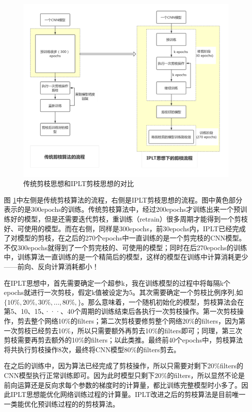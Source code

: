 \documentclass[ pdftex, oneside, master]{NJUthesis}
\begin{document}
\begin{figure}
\centering
\includegraphics[width=\textwidth]{pruning_contrast.pdf}
\caption{传统剪枝思想和IPLT剪枝思想的对比}
\label{pruning_contrast2}
\end{figure}

图 \ref{pruning_contrast2}中左侧是传统剪枝算法的流程，右侧是IPLT剪枝思想的流程。图中黄色部分表示的是300epochs的训练。传统剪枝算法中，经过200epochs才训练出来一个预训练好的模型，但是还需要迭代剪枝，重训练（retrain）很多周期才能得到一个剪枝好、可使用的模型。而在右侧，同样是300epochs，前30epochs内，IPLT已经完成了对模型的剪枝，在之后的270个epochs中一直训练的是一个剪完枝的CNN模型。不仅300epochs就得到了一个剪完枝的、可使用的模型；同时在后270epochs的训练中，训练算法一直训练的是一个精简后的模型，这样的模型在训练中计算消耗更少——前向、反向计算消耗都小！

在IPLT思想中，首先需要确定一个超参k，我在训练模型的过程中将每隔k个epochs就进行一次剪枝，假定k值被设定为5。其次需要确定一个剪枝比例序列,如$\{10\%, 20\%, 30\%, \dots, 80\%,\}$。那么意味着，一个随机初始化的模型，剪枝算法会在第5、10、15、···、40个周期的训练结束后各执行一次剪枝操作。第一次剪枝操作，剪去整个网络10\%的filters；第二次剪枝要修剪整个网络20\%的filters，因为第一次剪枝已经剪去10\%，所以只需要额外再剪去10\%的filters即可；同理，第三次剪枝需要再剪去额外的10\%的filters；以此类推。最终前40个epochs中，剪枝算法将共执行剪枝操作8次，最终将CNN模型80\%的filters剪去。

在之后的训练中，因为算法已经完成了剪枝操作，所以只需要对剩下20\%filters的CNN模型执行正常训练即可。因为此时模型只剩下20\%的filters，所以显然不论是前向运算还是反向求每个参数的梯度时的计算量，都比训练完整模型时小多了。因此IPLT思想能优化网络训练过程的计算量。IPLT改进之后的剪枝算法是目前唯一一类能优化预训练过程的的剪枝算法。
\end{document}
